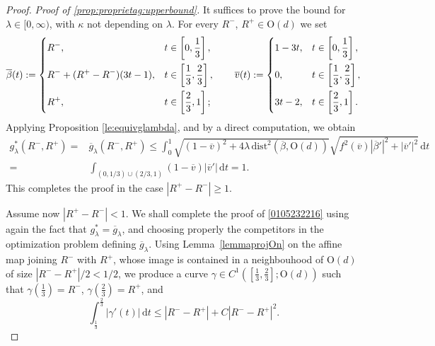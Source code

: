 \documentclass[a4paper,reqno]{amsart}
\newcommand\dist{{\mathrm{dist}}}
\newcommand\dt{{\,\mathrm{d}t}}
\theoremstyle{remark}
\newcommand{\ol}{\overline}
\newcommand{\On}{\mathrm{O}(d)}
\numberwithin{equation}{section}
\begin{document}
\begin{proof} 
\noindent \textit{Proof of \ref{prop:proprietag:upperbound}.}
It suffices to prove the bound for $\lambda\in [0,\infty)$, with $\kappa$ not depending on $\lambda$.
For every $ R^-$, $ R^+\in\On$ we set
\[
\ol\beta(t):=
\begin{dcases}
	 R^-, & t\in \left[0,\frac13\right], \\
R^-+(R^+-R^-)(3t-1), &   t\in \left[\frac13,\frac23\right], \\
	 R^+,&  t\in \left[\frac23,1\right];
\end{dcases}
\qquad 
\ol v(t) :=
\begin{dcases}
	1-3t, &  t\in \left[0,\frac13\right], \\
	0, &   t\in  \left[\frac13,\frac23\right], \\
	3t-2, &  t\in  \left[\frac23,1\right] .
\end{dcases}
\]	
Applying Proposition \ref{le:equivglambda}, and by a direct computation, we obtain
\begin{equation}\label{eqglambdale1}
\begin{split}
	g^*_\lambda( R^-, R^+) =& \ol g_\lambda( R^-, R^+) 
	\leq   \int_0^1 \sqrt{(1-\ol v)^2+4\lambda\, \dist^2(\ol\beta,\On)} \sqrt{f^2(\ol v) |\ol\beta'|^2+|\ol v'|^2} \dt\\
	= & \int_{(0,1/3)\cup (2/3,1)}(1-\ol v) |\ol v'| \dt= 1.
\end{split}
\end{equation}
This completes the proof in the case
$|R^+-R^-|\ge 1$.

Assume now
$|R^+-R^-|< 1$.
We shall complete the proof of \eqref{0105232216} using again the fact that $g^*_\lambda=\ol g_\lambda$, and choosing properly the competitors in the optimization problem defining $\ol g_\lambda$.
Using Lemma~\ref{lemmaprojOn} on the affine map joining $R^-$ with $R^+$, whose image is contained in a neighbouhood of $\On$ of size $|R^--R^+|/2<1/2$, we produce a curve 
$\gamma\in C^1([\frac13, \frac23];\On)$ such that
$\gamma(\frac13)=R^-$, $\gamma(\frac23)=R^+$, and
\[
\int_{\frac13}^{\frac23} |\gamma'(t)|\dt\le  |R^--R^+|+C|R^--R^+|^2.
\]  



\end{proof}
\end{document}
